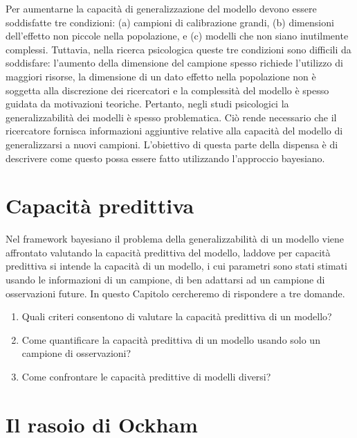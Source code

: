 \documentclass[
  11pt,
]{krantz}
\providecommand{\tightlist}{%
  \setlength{\itemsep}{0pt}\setlength{\parskip}{0pt}}
\theoremstyle{definition}
\theoremstyle{definition}
\theoremstyle{definition}
\theoremstyle{definition}
\theoremstyle{remark}
\begin{document}
Per aumentarne la capacità di generalizzazione del modello devono essere soddisfatte tre condizioni: (a) campioni di calibrazione grandi, (b) dimensioni dell'effetto non piccole nella popolazione, e (c) modelli che non siano inutilmente complessi. Tuttavia, nella ricerca psicologica queste tre condizioni sono difficili da soddisfare: l'aumento della dimensione del campione spesso richiede l'utilizzo di maggiori risorse, la dimensione di un dato effetto nella popolazione non è soggetta alla discrezione dei ricercatori e la complessità del modello è spesso guidata da motivazioni teoriche. Pertanto, negli studi psicologici la generalizzabilità dei modelli è spesso problematica. Ciò rende necessario che il ricercatore fornisca informazioni aggiuntive relative alla capacità del modello di generalizzarsi a nuovi campioni. L'obiettivo di questa parte della dispensa è di descrivere come questo possa essere fatto utilizzando l'approccio bayesiano.

\hypertarget{capacituxe0-predittiva}{%
\section{Capacità predittiva}\label{capacituxe0-predittiva}}

Nel framework bayesiano il problema della generalizzabilità di un modello viene affrontato valutando la capacità predittiva del modello, laddove per capacità predittiva si intende la capacità di un modello, i cui parametri sono stati stimati usando le informazioni di un campione, di ben adattarsi ad un campione di osservazioni future. In questo Capitolo cercheremo di rispondere a tre domande.

\begin{enumerate}
\def\labelenumi{\arabic{enumi}.}
\tightlist
\item
  Quali criteri consentono di valutare la capacità predittiva di un modello?
\item
  Come quantificare la capacità predittiva di un modello usando solo un campione di osservazioni?
\item
  Come confrontare le capacità predittive di modelli diversi?
\end{enumerate}

\hypertarget{il-rasoio-di-ockham}{%
\section{Il rasoio di Ockham}\label{il-rasoio-di-ockham}}
\end{document}
